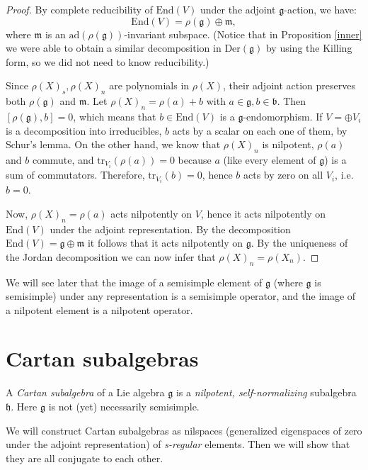 \begin{proof}
 By complete reducibility of $\text{End}(V)$ under the adjoint $\mathfrak g$-action, we have:
$$\text{End}(V)= \rho(\mathfrak g)\oplus\mathfrak m,$$
where $\mathfrak m$ is an $\text{ad}(\rho(\mathfrak g))$-invariant subspace. (Notice that in Proposition \ref{inner} we were able to obtain a similar decomposition in $\text{Der}(\mathfrak g)$ by using the Killing form, so we did not need to know reducibility.)

Since $\rho(X)_s,\rho(X)_n$ are polynomials in $\rho(X)$, their adjoint action preserves both $\rho(\mathfrak g)$ and $\mathfrak m$. Let $\rho(X)_n = \rho(a) + b$ with $a\in \mathfrak g,b\in \mathfrak b$. Then $[\rho(\mathfrak g),b]=0$, which means that $b\in \text{End}(V)$ is a $\mathfrak g$-endomorphism. If $V=\oplus V_i$ is a decomposition into irreducibles, $b$ acts by a scalar on each one of them, by Schur's lemma. On the other hand, we know that $\rho(X)_n$ is nilpotent, $\rho(a)$ and $b$ commute, and $\text{tr}_{V_i}(\rho(a)) =0$ because $a$ (like every element of $\mathfrak g$) is a sum of commutators. Therefore, $\text{tr}_{V_i}(b)=0$, hence $b$ acts by zero on all $V_i$, i.e.\ $b=0$. 

Now, $\rho(X)_n=\rho(a)$ acts nilpotently on $V$, hence it acts nilpotently on $\text{End}(V)$ under the adjoint representation. By the decomposition $\text{End}(V)=\mathfrak g\oplus \mathfrak m$ it follows that it acts nilpotently on $\mathfrak g$. By the uniqueness of the Jordan decomposition we can now infer that $\rho(X)_n= \rho(X_n)$. 
\end{proof}



We will see later that the image of a semisimple element of $\mathfrak g$ (where $\mathfrak g$ is semisimple) under any representation is a semisimple operator, and the image of a nilpotent element is a nilpotent operator.



\section{Cartan subalgebras}

A \emph{Cartan subalgebra} of a Lie algebra $\mathfrak g$ is a \emph{nilpotent, self-normalizing} subalgebra $\mathfrak h$. Here $\mathfrak g$ is not (yet) necessarily semisimple.

We will construct Cartan subalgebras as nilspaces (generalized eigenspaces of zero under the adjoint representation) of \emph{s-regular} elements. Then we will show that they are all conjugate to each other.

